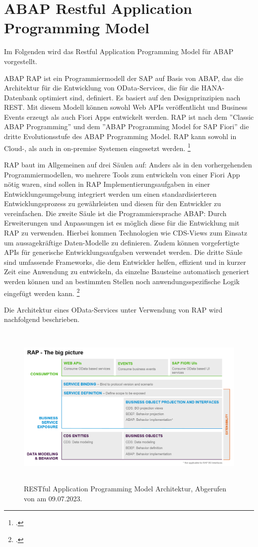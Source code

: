 \section{ABAP Restful Application Programming Model}

Im Folgenden wird das Restful Application Programming Model für ABAP vorgestellt.

ABAP RAP ist ein Programmiermodell der SAP auf Basis von ABAP, das die Architektur für die Entwicklung von OData-Services, die für die HANA-Datenbank optimiert sind, definiert. Es basiert auf den Designprinzipien nach REST. Mit diesem Modell können sowohl Web APIs veröffentlicht und Business Events erzeugt als auch Fiori Apps entwickelt werden. RAP ist nach dem ''Classic ABAP Programming'' und dem ''ABAP Programming Model for SAP Fiori'' die dritte Evolutionsstufe des ABAP Programming Model. RAP kann sowohl in Cloud-, als auch in on-premise Systemen eingesetzt werden. \footcite[Vgl.][]{sap_rap_2023}

RAP baut im Allgemeinen auf drei Säulen auf: Anders als in den vorhergehenden Programmiermodellen, wo mehrere Tools zum entwickeln von \zB einer Fiori App nötig waren, sind sollen in RAP Implementierungsaufgaben in einer Entwicklungsumgebung integriert werden um einen standardisierteren Entwicklungsprozess zu gewährleisten und diesen für den Entwickler zu vereinfachen. Die zweite Säule ist die Programmiersprache ABAP: Durch Erweiterungen und Anpassungen ist es möglich diese für die Entwicklung mit RAP zu verwenden. Hierbei kommen Technologien wie CDS-Views zum Einsatz um aussagekräftige Daten-Modelle zu definieren. Zudem können vorgefertigte APIs für generische Entwicklungsaufgaben verwendet werden. Die dritte Säule sind umfassende Frameworks, die dem Entwickler helfen, effizient und in kurzer Zeit eine Anwendung zu entwickeln, da einzelne Bausteine automatisch generiert werden können und an bestimmten Stellen noch anwendungsspezifische Logik eingefügt werden kann. \footcite[Vgl.][]{sap_rap_2023}

Die Architektur eines OData-Services unter Verwendung von RAP wird nachfolgend beschrieben.

\begin{figure}[h]
    \centering
    \includegraphics[height=8cm]{Bilder/RAP_Architektur.png}
    \caption[RESTful Application Programming Model Architektur]{RESTful Application Programming Model Architektur, Abgerufen von \cite{sap_rap_2023} am 09.07.2023.}
    \label{fig:iso_norm}
\end{figure}

